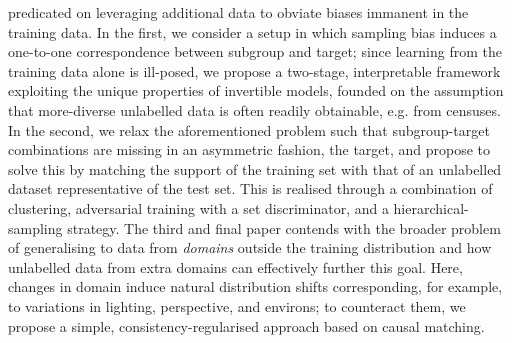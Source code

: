 predicated on leveraging additional data to obviate biases immanent in the training data.
%
In the first, we consider a setup in which sampling bias induces a one-to-one correspondence
between subgroup and target; since learning from the training data alone is ill-posed, we propose
a two-stage, interpretable framework exploiting the unique properties of invertible models, founded
on the assumption that more-diverse unlabelled data is often readily obtainable, e.g. from
censuses.
%
In the second, we relax the aforementioned problem such that subgroup-target combinations are
missing in an asymmetric fashion, \wrt{} the target, and propose to solve this by matching the
support of the training set with that of an unlabelled dataset representative of the test set. 
%
This is realised through a combination of clustering, adversarial training with a set
discriminator, and a hierarchical-sampling strategy.
%
The third and final paper contends with the broader problem of generalising to data from
\emph{domains} outside the training distribution  and how unlabelled data from extra domains can
effectively further this goal.
%
Here, changes in domain induce natural distribution shifts corresponding, for example, to
variations in lighting, perspective, and environs; to counteract them, we propose a simple,
consistency-regularised approach based on causal matching.


\endgroup

\vfill
